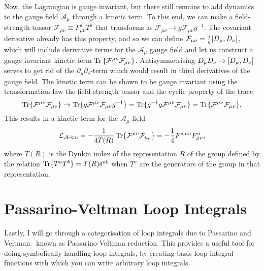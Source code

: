\documentclass[../main.tex]{subfiles}
\begin{document}
Now, the Lagrangian is gauge invariant, but there still remains to add dynamics
to the gauge field \(\mathcal{A}_\mu\) through a kinetic term.
To this end, we can make a field-strength tensor \(\mathcal{F}_{\mu\nu} \equiv
F_{\mu\nu}^a T^a\) that transforms as \(\mathcal{F}_{\mu\nu} \to g
\mathcal{F}_{\mu\nu} g^{-1}\).
The covariant derivative already has this property, and so we can define
\(\mathcal{F}_{\mu\nu} = \frac{i}{q} [D_\mu,D_\nu]\), which will include
derivative terms for the \(\mathcal{A}_\mu\) gauge field and let us construct a
gauge invariant kinetic term \(\operatorname{Tr}\left\{\mathcal{F}^{\mu\nu} \mathcal{F}_{\mu\nu}\right\}\).
Antisymmetrising \(D_\mu D_\nu \to [D_\mu,D_\nu]\) serves to get rid of the \(\partial_\mu \partial_\nu\)-term which would result in third derivatives of the gauge field.
The kinetic term can be shown to be gauge invariant using the transformation law the field-strength tensor and the cyclic property of the trace
\begin{equation}
  \operatorname{Tr}\{\mathcal{F}^{\mu\nu} \mathcal{F}_{\mu\nu}\} \to
  \operatorname{Tr}\{g \mathcal{F}^{\mu\nu} \mathcal{F}_{\mu\nu} g^{-1}\} =
  \operatorname{Tr}\{g^{-1} g \mathcal{F}^{\mu\nu} \mathcal{F}_{\mu\nu}\} =
  \operatorname{Tr}\{\mathcal{F}^{\mu\nu} \mathcal{F}_{\mu\nu}\}.
\end{equation}
This results in a kinetic term for the \(\mathcal{A}_\mu\)-field
\begin{equation}
  \label{qft:eq:Akin}
  \mathcal{L}_{\mathcal{A}\text{-kin}} = -\frac{1}{4T(R)} \operatorname{Tr}\{\mathcal{F}^{\mu\nu} \mathcal{F}_{\mu_\nu}\} = -\frac{1}{4} F^{a\,\mu\nu} F^a_{\mu\nu},
\end{equation}
where \(T(R)\) is the Dynkin index of the representation \(R\) of the group defined by the relation \(\operatorname{Tr}\{T^a T^b\} = T(R) \delta^{ab}\) when \(T^a\) are the generators of the group in that representation.




\section{Passarino-Veltman Loop Integrals}
\label{qft:sec:pave}
Lastly, I will go through a categorisation of loop integrals due to Passarino and Veltman~\cite{PaVe} known as Passarino-Veltman reduction.
This provides a useful tool for doing symbolically handling loop integrals, by creating basis loop integral functions with which you can write arbitrary loop integrals.
\medskip
\end{document}
